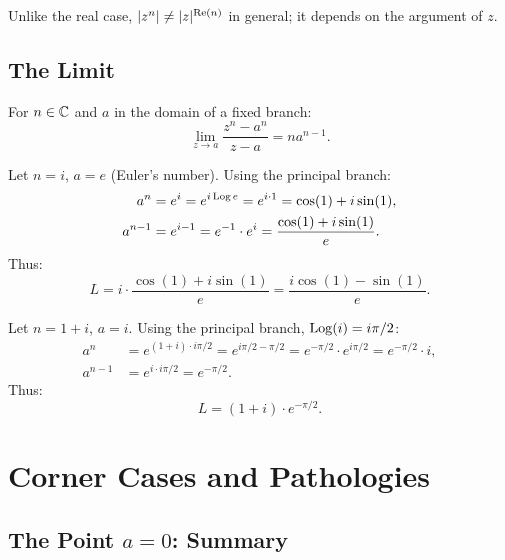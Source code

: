 \begin{remark}
Unlike the real case, $|z^n| \neq |z|^{\operatorname{Re}(n)}$ in general; it depends on the argument of $z$.
\end{remark}

\subsection{The Limit}

\begin{theorem}
For $n \in \mathbb{C}$ and $a$ in the domain of a fixed branch:
\begin{equation}
\lim_{z \to a} \frac{z^n - a^n}{z - a} = n a^{n-1}.
\end{equation}
\end{theorem}

\begin{example}
Let $n = i$, $a = e$ (Euler's number). Using the principal branch:
\begin{align}
a^n &= e^i = e^{i \operatorname{Log} e} = e^{i \cdot 1} = \cos(1) + i\sin(1), \\
a^{n-1} &= e^{i-1} = e^{-1} \cdot e^i = \frac{\cos(1) + i\sin(1)}{e}.
\end{align}
Thus:
\begin{equation}
L = i \cdot \frac{\cos(1) + i\sin(1)}{e} = \frac{i\cos(1) - \sin(1)}{e}.
\end{equation}
\end{example}

\begin{example}
Let $n = 1 + i$, $a = i$. Using the principal branch, $\operatorname{Log}(i) = i\pi/2$:
\begin{align}
a^n &= e^{(1+i) \cdot i\pi/2} = e^{i\pi/2 - \pi/2} = e^{-\pi/2} \cdot e^{i\pi/2} = e^{-\pi/2} \cdot i, \\
a^{n-1} &= e^{i \cdot i\pi/2} = e^{-\pi/2}.
\end{align}
Thus:
\begin{equation}
L = (1+i) \cdot e^{-\pi/2}.
\end{equation}
\end{example}

\section{Corner Cases and Pathologies}

\subsection{The Point $a = 0$: Summary}

